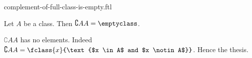 \documentclass{article}
\begin{document}
\begin{smodule}[creators={Marcel Schütz}]{complement-of-full-class-is-empty.ftl}

  \begin{fproposition*}[label=7846433484963840]
    Let $A$ be a class.
    Then $\complement{A}{A} = \emptyclass$.
  \end{fproposition*}
  \begin{fproof}
    $\complement{A}{A}$ has no elements.
    Indeed $\complement{A}{A} = \fclass{x}{\text{$x \in A$ and $x \notin A$}}$.
    Hence the thesis.
  \end{fproof}
\end{smodule}
\end{document}
